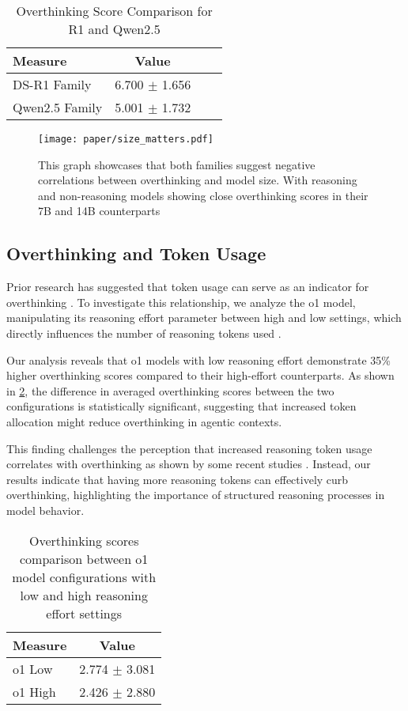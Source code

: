 \begin{table}[ht]
\centering
\begin{tabular}{lccc}
\bottomrule
\textbf{Measure} & \textbf{Value} \\
\midrule
DS-R1 Family        & 6.700 $\pm$ 1.656 \\
Qwen2.5 Family      & 5.001 $\pm$ 1.732 \\
\bottomrule
\end{tabular}
\caption{Overthinking Score Comparison for R1 and Qwen2.5}
\label{tab:overthinking_comparison}
\end{table}






\begin{figure}[t]
    \centering
    \texttt{[image: paper/size\_matters.pdf]}
    \vspace{-25pt}
    \caption{This graph showcases that both families suggest negative correlations between overthinking and model size. With reasoning and non-reasoning models showing close overthinking scores in their 7B and 14B counterparts}
    \label{figure5}
\end{figure}

\subsection{Overthinking and Token Usage}
Prior research has suggested that token usage can serve as an indicator for overthinking \cite{chen2024think23overthinkingo1like}. To investigate this relationship, we analyze the o1 model, manipulating its reasoning effort parameter between high and low settings, which directly influences the number of reasoning tokens used \cite{openai_chat_api}.

Our analysis reveals that o1 models with low reasoning effort demonstrate 35\% higher overthinking scores compared to their high-effort counterparts. As shown in \cref{tab:o1_model_comparison}, the difference in averaged overthinking scores between the two configurations is statistically significant, suggesting that increased token allocation might reduce overthinking in agentic contexts.

This finding challenges the perception that increased reasoning token usage correlates with overthinking as shown by some recent studies \cite{chen2024think23overthinkingo1like}. Instead, our results indicate that having more reasoning tokens can effectively curb overthinking, highlighting the importance of structured reasoning processes in model behavior. 
\begin{table}[ht]
\centering
\begin{tabular}{lc}
\toprule
\textbf{Measure} & \textbf{Value} \\
\midrule
o1 Low        & 2.774 $\pm$ 3.081 \\
o1 High       & 2.426 $\pm$ 2.880 \\
\bottomrule
\end{tabular}
\caption{Overthinking scores comparison between o1 model configurations with low and high reasoning effort settings}
\label{tab:o1_model_comparison}
\end{table}
